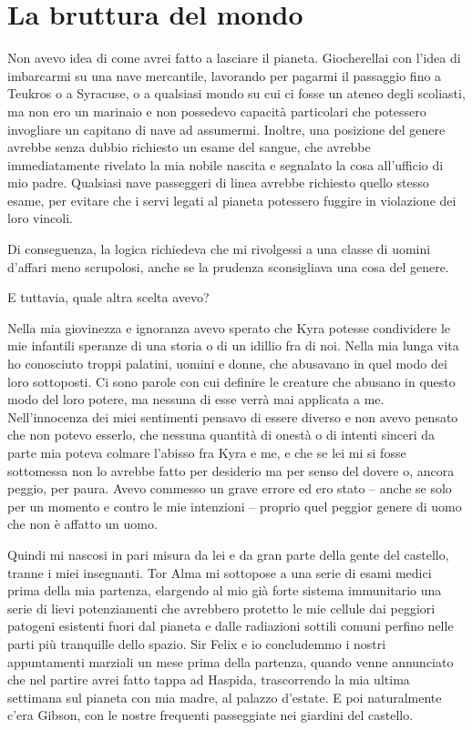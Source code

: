 \chapter{La bruttura del mondo}

Non avevo idea di come avrei fatto a lasciare il pianeta. Giocherellai
con l'idea di imbarcarmi su una nave mercantile, lavorando per pagarmi
il passaggio fino a Teukros o a Syracuse, o a qualsiasi mondo su cui ci
fosse un ateneo degli scoliasti, ma non ero un marinaio e non possedevo
capacità particolari che potessero invogliare un capitano di nave ad
assumermi. Inoltre, una posizione del genere avrebbe senza dubbio
richiesto un esame del sangue, che avrebbe immediatamente rivelato la
mia nobile nascita e segnalato la cosa all'ufficio di mio padre.
Qualsiasi nave passeggeri di linea avrebbe richiesto quello stesso
esame, per evitare che i servi legati al pianeta potessero fuggire in
violazione dei loro vincoli.

Di conseguenza, la logica richiedeva che mi rivolgessi a una classe di
uomini d'affari meno scrupolosi, anche se la prudenza sconsigliava una
cosa del genere.

E tuttavia, quale altra scelta avevo?

Nella mia giovinezza e ignoranza avevo sperato che Kyra potesse
condividere le mie infantili speranze di una storia o di un idillio fra
di noi. Nella mia lunga vita ho conosciuto troppi palatini, uomini e
donne, che abusavano in quel modo dei loro sottoposti. Ci sono parole
con cui definire le creature che abusano in questo modo del loro potere,
ma nessuna di esse verrà mai applicata a me. Nell'innocenza dei miei
sentimenti pensavo di essere diverso e non avevo pensato che non potevo
esserlo, che nessuna quantità di onestà o di intenti sinceri da parte
mia poteva colmare l'abisso fra Kyra e me, e che se lei mi si fosse
sottomessa non lo avrebbe fatto per desiderio ma per senso del dovere o,
ancora peggio, per paura. Avevo commesso un grave errore ed ero stato --
anche se solo per un momento e contro le mie intenzioni -- proprio quel
peggior genere di uomo che non è affatto un uomo.

Quindi mi nascosi in pari misura da lei e da gran parte della gente del
castello, tranne i miei insegnanti. Tor Alma mi sottopose a una serie di
esami medici prima della mia partenza, elargendo al mio già forte
sistema immunitario una serie di lievi potenziamenti che avrebbero
protetto le mie cellule dai peggiori patogeni esistenti fuori dal
pianeta e dalle radiazioni sottili comuni perfino nelle parti più
tranquille dello spazio. Sir Felix e io concludemmo i nostri
appuntamenti marziali un mese prima della partenza, quando venne
annunciato che nel partire avrei fatto tappa ad Haspida, trascorrendo la
mia ultima settimana sul pianeta con mia madre, al palazzo d'estate. E
poi naturalmente c'era Gibson, con le nostre frequenti passeggiate nei
giardini del castello.

